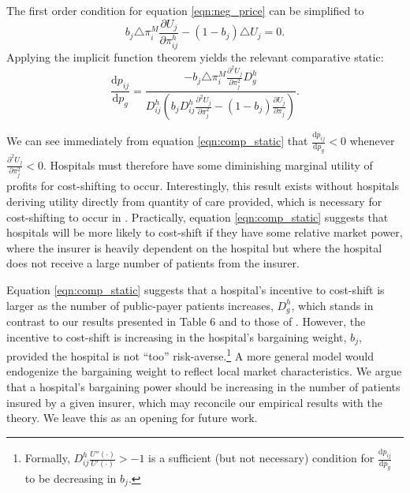 \documentclass[12pt]{article}
\newcommand{\deriv}[2]{\frac{\mathrm{d}#1}{\mathrm{d}#2}}
\newcommand{\pderiv}[2]{\frac{\partial#1}{\partial#2}}
\begin{document}
The first order condition for equation \ref{eqn:neg_price} can be simplified to
\begin{equation}
 b_{j} \triangle \pi_{i}^{M} \pderiv{U_{j}}{\pi_{ij}^{h}} - (1-b_{j}) \triangle U_{j} = 0.
\label{eqn:price_foc}
\end{equation}
Applying the implicit function theorem yields the relevant comparative static:
\begin{equation}
\deriv{p_{ij}}{p_{g}} = \frac{- b_{j} \triangle \pi_{i}^{M} \pderiv{^{2}U_{j}}{\pi_{j}^{2}}D_{g}^{h}}{D_{ij}^{h}\left(b_{j} D_{ij}^{h} \pderiv{^{2}U_{j}}{\pi_{j}^{2}} - (1-b_{j}) \pderiv{U_{j}}{\pi_{j}} \right)}.
\label{eqn:comp_static}
\end{equation}

We can see immediately from equation \ref{eqn:comp_static} that $\deriv{p_{ij}}{p_{g}}<0$ whenever $\pderiv{^{2}U_{j}}{\pi_{j}^{2}}<0$. Hospitals must therefore have some diminishing marginal utility of profits for cost-shifting to occur. Interestingly, this result exists without hospitals deriving utility directly from quantity of care provided, which is necessary for cost-shifting to occur in \cite{dranove1988}.  Practically, equation \ref{eqn:comp_static} suggests that hospitals will be more likely to cost-shift if they have some relative market power, where the insurer is heavily dependent on the hospital but where the hospital does not receive a large number of patients from the insurer. 


Equation \ref{eqn:comp_static} suggests that a hospital's incentive to cost-shift is larger as the number of public-payer patients increases, $D_{g}^{h}$, which stands in contrast to our results presented in Table 6 and to those of \cite{wu2010}.  
However, the incentive to cost-shift is increasing in the hospital's bargaining weight, $b_{j}$, provided the hospital is not ``too'' risk-averse.\footnote{Formally, $D_{ij}^{h}\frac{U''(\cdot)}{U'(\cdot)}>-1$ is a sufficient (but not necessary) condition for $\deriv{p_{ij}}{p_{g}}$ to be decreasing in $b_{j}$.} A more general model would endogenize the bargaining weight to reflect local market characteristics.  We argue that a hospital's bargaining power should be increasing in the number of patients insured by a given insurer, which may reconcile our empirical results with the theory.  We leave this as an opening for future work.  
\end{document}
